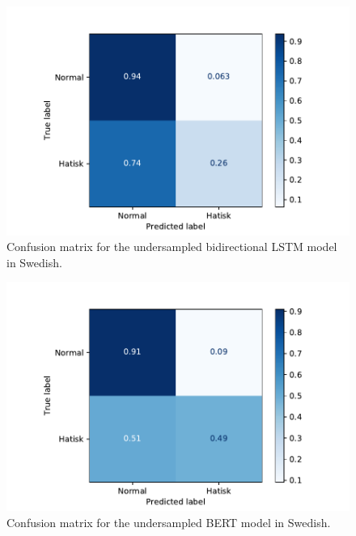 \documentclass[nofilelist]{cslthse-msc}
\begin{document}

\begin{figure}[t]
    \centering
    \includegraphics[width=\textwidth*3/4]{bilstmcharIfragasattundersampled.pdf}
    \caption{Confusion matrix for the undersampled bidirectional LSTM model in Swedish.}
    \label{fig:underBiLSTM}
\end{figure}


\begin{figure}[t]
    \centering
    \includegraphics[width=\textwidth*3/4]{bertIfragasattresampled.pdf}
    \caption{Confusion matrix for the undersampled BERT model in Swedish.}
    \label{fig:underBERT}
\end{figure}
\end{document}
